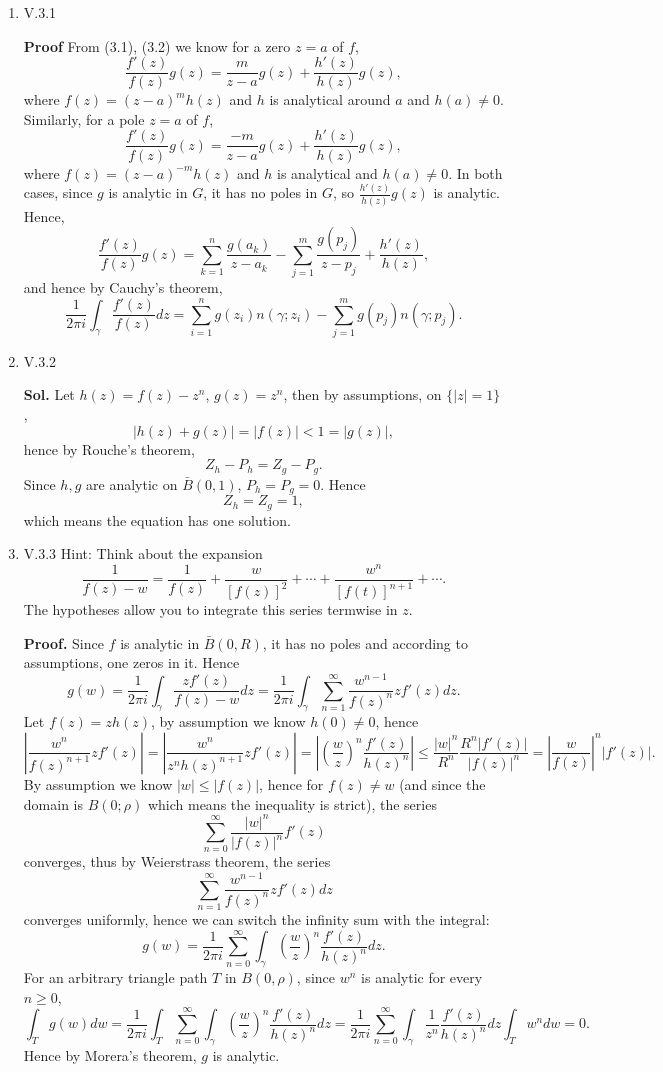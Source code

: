 \documentclass{article}%
\begin{document}
\begin{enumerate}


\item V.3.1

\textbf{Proof}
From (3.1), (3.2) we know for a zero $z = a$ of $f$,
$$
\frac{f'(z)}{f(z)}g(z) = \frac{m}{z-a}g(z) + \frac{h'(z)}{h(z)}g(z),
$$
where $f(z) = (z-a)^mh(z) $ and $h$ is analytical around $a$ and $h(a)\ne 0$. Similarly, for a pole $z = a$ of $f$,
$$
\frac{f'(z)}{f(z)}g(z) = \frac{-m}{z-a}g(z)+\frac{h'(z)}{h(z)}g(z),
$$
where $f(z) = (z-a)^{-m}h(z)$ and $h$ is analytical and $h(a)\ne 0$. In both cases, since $g$ is analytic in $G$, it has no poles in $G$, so $\frac{h'(z)}{h(z)}g(z)$ is analytic. Hence, 
$$
\frac{f'(z)}{f(z)}g(z) = \sum_{k=1}^{n}\frac{g(a_k)}{z-a_k} -\sum_{j = 1}^{m}\frac{g(p_j)}{z-p_j}+\frac{h'(z)}{h(z)},
$$
and hence by Cauchy's theorem,
$$
\frac{1}{2\pi i}\int_{\gamma}\frac{f'(z)}{f(z)}dz = \sum_{i=1}^{n}g(z_i)n(\gamma; z_i)-\sum_{j=1}^{m}g(p_j)n(\gamma; p_j).
$$


\item V.3.2

\textbf{Sol.} Let $h(z) = f(z) - z^n $, $g(z) = z^n $, then by assumptions, on $\{|z| = 1\}$,
$$
|h(z)+g(z)| = |f(z)| < 1 = |g(z)|,
$$
hence by Rouche's theorem,
$$
Z_h-P_h = Z_g-P_g.
$$
Since $h, g$ are analytic on $\bar{B}(0, 1)$, $P_h = P_g = 0 $. Hence
$$
Z_h = Z_g = 1,
$$
which means the equation has one solution.


\item V.3.3 Hint: Think about the expansion\[
 \frac{1}{f(z)-w} = \frac{1}{f(z)} + \frac{w}{[f(z)]^2} + \cdots + \frac{w^n}{[f(t)]^{n+1}}+\cdots .                                       
                                       \]The hypotheses allow you to integrate this series termwise in $z$.

\textbf{Proof.} Since $f$ is analytic in $\bar{B}(0, R)$, it has no poles and according to assumptions, one zeros in it. Hence
$$
g(w) = \frac{1}{2\pi i}\int_{\gamma}\frac{zf'(z)}{f(z)-w}dz = \frac{1}{2\pi i}\int_{\gamma}\sum_{n=1}^{\infty}\frac{w^{n-1}}{f(z)^n}zf'(z)dz.
$$
Let $f(z) = zh(z)$, by assumption we know $h(0)\ne 0$, hence
$$
\left|\frac{w^{n}}{f(z)^{n+1}}zf'(z)\right| = \left|\frac{w^{n}}{z^nh(z)^{n+1}}zf'(z)\right| = \left|\left(\frac{w}{z}\right)^n\frac{f'(z)}{h(z)^n}\right| \le \frac{|w|^n}{R^n}\frac{R^n|f'(z)|}{|f(z)|^n} = \left|\frac{w}{f(z)}\right|^n|f'(z)|.
$$
By assumption we know $|w| \le |f(z)|$, hence for $f(z)\ne w$ (and since the domain is $B(0; \rho)$ which means the inequality is strict), the series
$$
\sum_{n=0}^{\infty}\frac{|w|^n}{|f(z)|^n}f'(z)
$$
converges, thus by Weierstrass theorem, the series
$$
\sum_{n=1}^{\infty}\frac{w^{n-1}}{f(z)^n}zf'(z)dz
$$
converges uniformly, hence we can switch the infinity sum with the integral:
$$
g(w) = \frac{1}{2\pi i}\sum_{n=0}^{\infty} \int_{\gamma}\left(\frac{w}{z}\right)^n\frac{f'(z)}{h(z)^n}dz.
$$
For an arbitrary triangle path $T$ in $B(0,\rho)$, since $w^n $ is analytic for every $n \ge 0$,
$$
\int_{T}g(w)dw = \frac{1}{2\pi i}\int_{T}\sum_{n=0}^{\infty}\int_{\gamma}\left(\frac{w}{z}\right)^n\frac{f'(z)}{h(z)^n}dz = \frac{1}{2\pi i}\sum_{n=0}^{\infty}\int_{\gamma}\frac{1}{z^n}\frac{f'(z)}{h(z)^n}dz\int_{T}w^ndw = 0.
$$
Hence by Morera's theorem, $g$ is analytic.


\end{enumerate}
\end{document}
